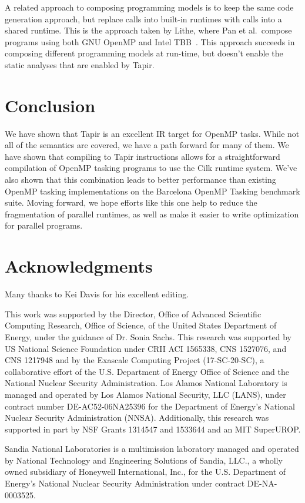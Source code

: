 \documentclass[sigconf]{acmart}
\begin{document}
A related approach to composing programming models is to keep the same code
generation approach, but replace calls into built-in runtimes with calls into a
shared runtime. This is the approach taken by Lithe, where Pan et
al.\ compose programs using both GNU OpenMP and Intel TBB~\cite{lithe}. This approach succeeds
in composing different programming models at run-time, but doesn't enable the
static analyses that are enabled by Tapir.

\section{Conclusion} \label{Sec:Conclusion}
We have shown that Tapir is an excellent IR target for OpenMP tasks. While not
all of the semantics are covered, we have a path forward for many of them. We have
shown that compiling to Tapir instructions allows for a straightforward compilation of
OpenMP tasking programs to use the Cilk runtime system. We've also shown that this
combination leads to better performance than existing OpenMP tasking implementations
on the Barcelona OpenMP Tasking benchmark suite. Moving forward, we hope efforts like
this one help to reduce the fragmentation of parallel runtimes, as well as make
it easier to write optimization for parallel programs.

\section*{Acknowledgments}

Many thanks to Kei Davis for his excellent editing.

This work was supported by the Director, Office of Advanced Scientific
Computing Research, Office of Science, of the United States Department
of Energy, under the guidance of Dr. Sonia Sachs. This research was
supported by US National Science Foundation under CRII ACI 1565338,
CNS 1527076, and CNS 1217948 and by the Exascale Computing Project
(17-SC-20-SC), a collaborative effort of the U.S. Department of Energy
Office of Science and the National Nuclear Security Administration.
Los Alamos National Laboratory is managed and operated by Los Alamos
National Security, LLC (LANS), under contract number DE-AC52-06NA25396
for the Department of Energy's National Nuclear Security
Administration (NNSA). Additionally, this research was supported in
part by NSF Grants 1314547 and 1533644 and an MIT SuperUROP.

Sandia National Laboratories is a multimission laboratory managed and
operated by National Technology and Engineering Solutions of Sandia,
LLC., a wholly owned subsidiary of Honeywell International, Inc., for
the U.S. Department of Energy's National Nuclear Security
Administration under contract DE-NA-0003525.



\end{document}
